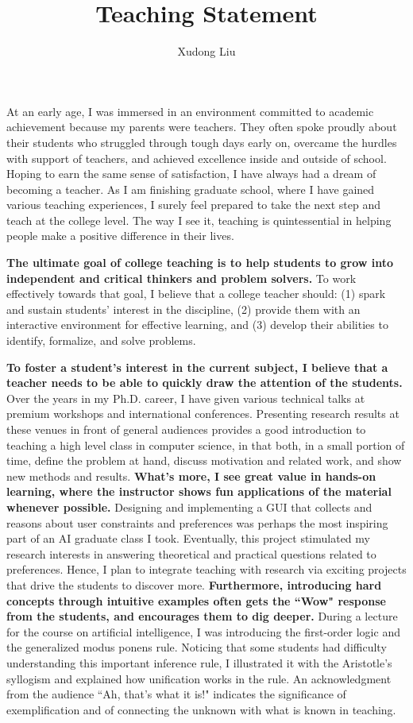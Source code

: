 \documentclass[12pt]{article}
\title{Teaching Statement\vspace{-0.4cm}}
\author{Xudong Liu}
\date{}
\newcommand{\tbf}[1]{\textbf{#1}}
\begin{document}
\maketitle%

At an early age, I was immersed in an environment committed to academic achievement
because my parents were teachers.
They often spoke proudly about their students who
struggled through tough days early on, overcame the hurdles with support of teachers, and 
achieved excellence inside and outside of school. 
Hoping to earn the same sense of satisfaction, I have always had a dream of becoming a teacher.
As I am finishing graduate school, where I have gained various teaching experiences,
I surely feel prepared to take the next step and teach at the college level.
The way I see it,
teaching is quintessential in helping people make a positive difference in their lives.

\tbf{The ultimate goal of college teaching is to help students to grow into independent 
and critical thinkers and problem solvers.}
To work effectively towards that goal, I believe that a college teacher should:
(1) spark and sustain students' interest in the discipline,
(2) provide them with an interactive environment for effective learning, and
(3) develop their abilities to identify, formalize,
and solve problems.

\tbf{To foster a student's interest in the current subject, 
I believe that a teacher needs to be able to quickly draw the attention of the students.}
Over the years in my Ph.D. career, I have given various technical
talks at premium workshops and international conferences.
Presenting research results at these venues in front of general audiences
provides a good introduction to teaching a high level class in computer science,
in that both, in a small portion of time, define the problem at hand, discuss motivation and related work,
and show new methods and results.
\tbf{What's more, I see great value in hands-on learning, where the instructor shows fun
applications of the material whenever possible.}
Designing and implementing a GUI that collects and reasons about user constraints and preferences
was perhaps the most inspiring part of an AI graduate class I took.
Eventually, this project stimulated my research interests in answering theoretical and
practical questions related to preferences.
Hence, I plan to integrate teaching with research via exciting projects that
drive the students to discover more.
\tbf{Furthermore, 
introducing hard concepts through intuitive examples often
gets the ``Wow" response from the students, and
encourages them to dig deeper.}
During a lecture for the course on artificial intelligence,
I was introducing the first-order logic and the generalized modus ponens
rule.  Noticing that some students had difficulty understanding this
important inference rule, I illustrated it with the 
Aristotle's syllogism and explained how unification works in the rule.
An acknowledgment from the audience ``Ah, that's what it is!" indicates
the significance of exemplification and of connecting the unknown with
what is known in teaching.
\end{document}
